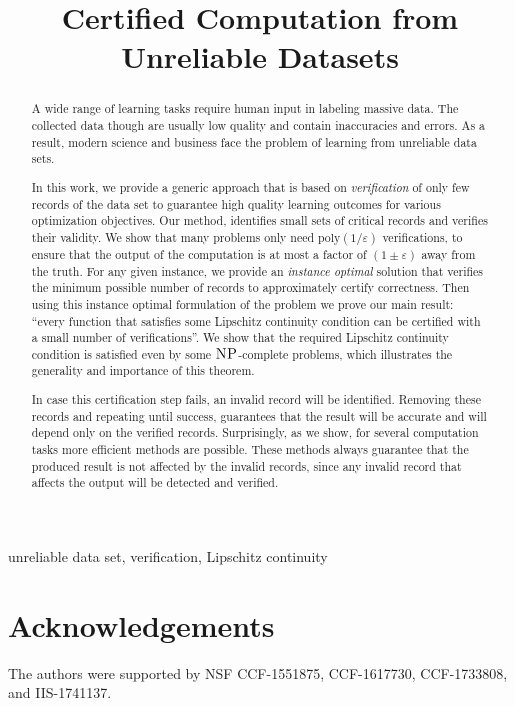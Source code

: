 \documentclass[final,12pt]{colt2018}
\title[Certified Computation from Unreliable Datasets]{Certified Computation from Unreliable Datasets}
\def\poly{\mathrm{poly}}
\def\eps{\varepsilon}
\def\NP{\textsc{NP}}
\begin{document}
\maketitle

\begin{abstract}
  A wide range of learning tasks require human input in labeling massive data.
  The collected data though are usually low quality and contain inaccuracies and
  errors. As a result, modern science and business face the problem of learning
  from unreliable data sets.

  In this work, we provide a generic approach that is based on
  \textit{verification} of only few records of the data set to guarantee high
  quality learning outcomes for various optimization objectives. Our method,
  identifies small sets of critical records and verifies their validity. We show
  that many problems only need $\poly(1/\eps)$ verifications, to ensure that the
  output of the computation is at most a factor of $(1 \pm \eps)$ away from the
  truth. For any given instance, we provide an \textit{instance optimal}
  solution that verifies the minimum possible number of records to approximately
  certify correctness. Then using this instance optimal formulation of the
  problem we prove our main result: ``every function that satisfies some
  Lipschitz continuity condition can be certified with a small number of
  verifications''. We show that the required Lipschitz continuity condition is
  satisfied even by some $\NP$-complete problems, which illustrates the
  generality and importance of this theorem.

  In case this certification step fails, an invalid record will be identified.
  Removing these records and repeating until success, guarantees that the result
  will be accurate and will depend only on the verified records. Surprisingly,
  as we show, for several computation tasks more efficient methods are possible.
  These methods always guarantee that the produced result is not affected by the
  invalid records, since any invalid record that affects the output will be
  detected and verified.
\end{abstract}

\begin{keywords}
  unreliable data set, verification, Lipschitz continuity
\end{keywords}

  

  

  

  

  

  

  \section*{Acknowledgements}
  The authors were supported by NSF CCF-1551875, CCF-1617730, CCF-1733808, and
  IIS-1741137.

  

  \appendix
  \clearpage
  
\end{document}
